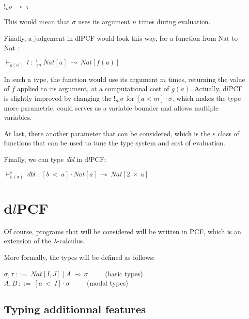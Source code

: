 \documentclass[a4paper,12pt]{report}
\begin{document}
\begin{center}
$!_{n}\sigma~\multimap~\tau$
\end{center} 

This would mean that $\sigma$ uses its argument $n$ times during evaluation. 

\medskip

Finally, a judgement in dlPCF would look this way, for a function from Nat to
Nat :

\begin{center}
$\vdash_{g(a)}~t~:~!_{m}~Nat[a]~\multimap~Nat[f(a)]$ 
\end{center}

In such a type, the function would use its argument $m$ times, returning 
the value of $f$ applied to its argument, at a computational cost of
$g(a)$. Actually, d$l$PCF is slightly improved by changing the $!_{m}\sigma$ for
$[a < m] \cdot \sigma$, which makes the type more parametric, could serves as a
variable bounder and allows multiple variables.

At last, there another parameter that con be considered, which is the $\varepsilon$
class of functions that can be used to tune the type system and cost of
evaluation.

Finally, we can type \emph{dbl} in d$l$PCF:

\begin{center}
$\vdash^{\varepsilon}_{h(a)}~dbl~:~[b~<~a] \cdot Nat[a]~\multimap~Nat[2~\times~a]$
\end{center}

\section{d$l$PCF}


Of course, programs that will be considered will be written in PCF, which is an
extension of the $\lambda$-calculus. 

More formally, the types will be defined as follows:

\begin{center}
  $\sigma, \tau~::=~Nat[I,J]~|~A~\multimap~\sigma$~~~~~(basic types) \\
  $A, B~::=~[a~<~I] \cdot \sigma$~~~~~(modal types)
\end{center}

\subsection{Typing additionnal features}
\end{document}
